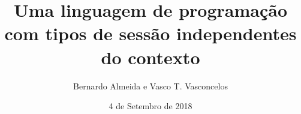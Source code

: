 \documentclass[unknownkeysallowed]{beamer}
\title[Uma linguagem com tipos de sessão independentes do contexto]{Uma linguagem de programação com tipos de
sessão independentes do contexto}
\author{Bernardo Almeida e Vasco T. Vasconcelos}
\institute{LASIGE, Faculdade de Ciências, Universidade de Lisboa}
\date{4 de Setembro de 2018}
\begin{document}
\begin{frame}[plain]
  \titlepage
\end{frame}




% 

\end{document}
